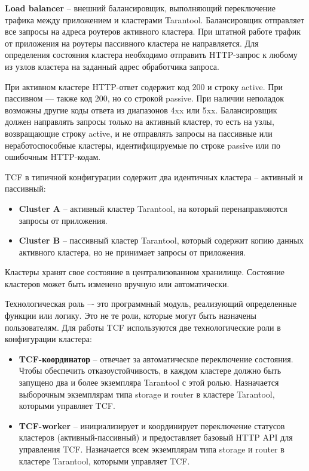 \textbf{Load balancer} -- внешний балансировщик, выполняющий переключение трафика между приложением и
кластерами Tarantool. Балансировщик отправляет все запросы на адреса роутеров активного кластера. При
штатной работе трафик от приложения на роутеры пассивного кластера не направляется. Для определения
состояния кластера необходимо отправить HTTP-запрос к любому из узлов кластера на заданный адрес
обработчика запроса.

При активном кластере HTTP-ответ содержит код 200 и строку active. При пассивном — также код 200, но со
строкой passive. При наличии неполадок возможны другие коды ответа из диапазонов 4xx или 5xx.
Балансировщик должен направлять запросы только на активный кластер, то есть на узлы, возвращающие строку
active, и не отправлять запросы на пассивные или неработоспособные кластеры, идентифицируемые по строке
passive или по ошибочным HTTP-кодам.

TCF в типичной конфигурации содержит два идентичных кластера – активный и пассивный:

\begin{itemize}
  \item \textbf{Cluster A} -- активный кластер Tarantool, на который перенаправляются запросы от
  приложения.
  \item \textbf{Cluster B} -- пассивный кластер Tarantool, который содержит копию данных активного
  кластера, но не принимает запросы от приложения.
\end{itemize}

Кластеры хранят свое состояние в централизованном хранилище. Состояние кластеров может быть изменено
вручную или автоматически.

Технологическая роль –- это программный модуль, реализующий определенные функции или логику. Это не те
роли, которые могут быть назначены пользователям. Для работы TCF используются две технологические роли в
конфигурации кластера:

\begin{itemize}
  \item \textbf{TCF-координатор} -- отвечает за автоматическое переключение состояния. Чтобы обеспечить
  отказоустойчивость, в каждом кластере должно быть запущено два и более экземпляра Tarantool с этой ролью.
  Назначается выборочным экземплярам типа storage и router в кластере Tarantool, которыми управляет TCF.
  \item \textbf{TCF-worker} -- инициализирует и координирует переключение статусов кластеров
  (активный-пассивный) и предоставляет базовый HTTP API для управления TCF. Назначается всем экземплярам
  типа storage и router в кластере Tarantool, которыми управляет TCF.
\end{itemize}

